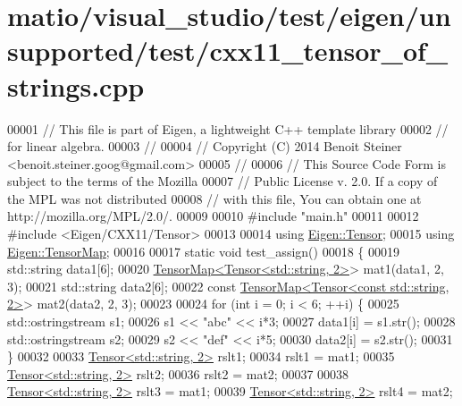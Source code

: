 \hypertarget{matio_2visual__studio_2test_2eigen_2unsupported_2test_2cxx11__tensor__of__strings_8cpp_source}{}\section{matio/visual\+\_\+studio/test/eigen/unsupported/test/cxx11\+\_\+tensor\+\_\+of\+\_\+strings.cpp}
\label{matio_2visual__studio_2test_2eigen_2unsupported_2test_2cxx11__tensor__of__strings_8cpp_source}

\begin{DoxyCode}
00001 \textcolor{comment}{// This file is part of Eigen, a lightweight C++ template library}
00002 \textcolor{comment}{// for linear algebra.}
00003 \textcolor{comment}{//}
00004 \textcolor{comment}{// Copyright (C) 2014 Benoit Steiner <benoit.steiner.goog@gmail.com>}
00005 \textcolor{comment}{//}
00006 \textcolor{comment}{// This Source Code Form is subject to the terms of the Mozilla}
00007 \textcolor{comment}{// Public License v. 2.0. If a copy of the MPL was not distributed}
00008 \textcolor{comment}{// with this file, You can obtain one at http://mozilla.org/MPL/2.0/.}
00009 
00010 \textcolor{preprocessor}{#include "main.h"}
00011 
00012 \textcolor{preprocessor}{#include <Eigen/CXX11/Tensor>}
00013 
00014 \textcolor{keyword}{using} \hyperlink{class_eigen_1_1_tensor}{Eigen::Tensor};
00015 \textcolor{keyword}{using} \hyperlink{class_eigen_1_1_tensor_map}{Eigen::TensorMap};
00016 
00017 \textcolor{keyword}{static} \textcolor{keywordtype}{void} test\_assign()
00018 \{
00019   std::string data1[6];
00020   \hyperlink{class_eigen_1_1_tensor_map}{TensorMap<Tensor<std::string, 2>}> mat1(data1, 2, 3);
00021   std::string data2[6];
00022   \textcolor{keyword}{const} \hyperlink{class_eigen_1_1_tensor_map}{TensorMap<Tensor<const std::string, 2>}> mat2(data2, 2, 3);
00023 
00024   \textcolor{keywordflow}{for} (\textcolor{keywordtype}{int} i = 0; i < 6; ++i) \{
00025     std::ostringstream s1;
00026     s1 << \textcolor{stringliteral}{"abc"} << i*3;
00027     data1[i] = s1.str();
00028     std::ostringstream s2;
00029     s2 << \textcolor{stringliteral}{"def"} << i*5;
00030     data2[i] = s2.str();
00031   \}
00032 
00033   \hyperlink{class_eigen_1_1_tensor}{Tensor<std::string, 2>} rslt1;
00034   rslt1 = mat1;
00035   \hyperlink{class_eigen_1_1_tensor}{Tensor<std::string, 2>} rslt2;
00036   rslt2 = mat2;
00037 
00038   \hyperlink{class_eigen_1_1_tensor}{Tensor<std::string, 2>} rslt3 = mat1;
00039   \hyperlink{class_eigen_1_1_tensor}{Tensor<std::string, 2>} rslt4 = mat2;

\end{DoxyCode}
